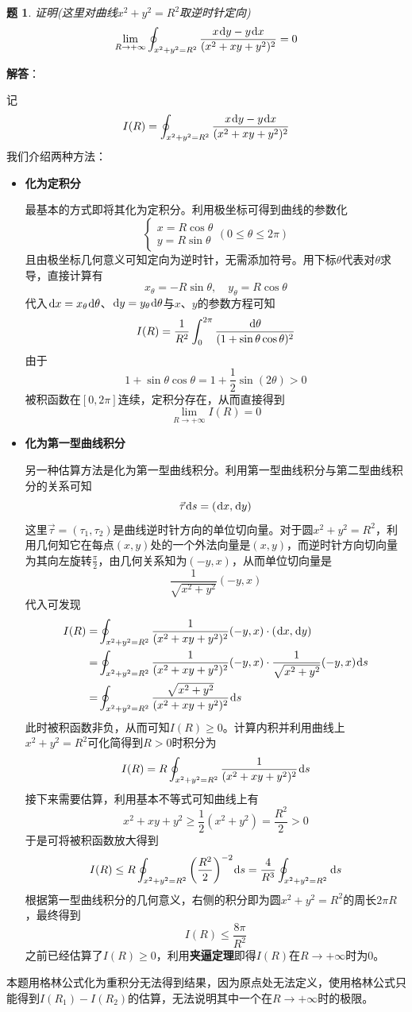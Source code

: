 \documentclass[a4paper,UTF8,fontset=windows,AutoFakeBold]{ctexart}
\newcommand*{\dr}{\hspace{0.07em}\mathrm{d}}
\newcommand*{\note}{\noindent *}
\theoremstyle{ex}
\newtheorem{exercise}{题}
\newcommand{\sol}[1]{{\vspace{5pt}\kaishu\noindent\textbf{解答}：\vspace{-3pt}
\begin{compactitem}
    \item[] #1
\end{compactitem}
}}
\begin{document}
\begin{framed}
\begin{exercise}\label{circle normal}
    证明(这里对曲线$x^2+y^2=R^2$取逆时针定向)
    $$\lim_{R\to+\infty}\oint_{x^2+y^2=R^2}\frac{x\dr y-y\dr x}{(x^2+xy+y^2)^2}=0$$
\end{exercise}
\sol{
    记
    $$I(R)=\oint_{x^2+y^2=R^2}\frac{x\dr y-y\dr x}{(x^2+xy+y^2)^2}$$
    我们介绍两种方法：
    \begin{itemize}
        \item \textbf{化为定积分}
        
        最基本的方式即将其化为定积分。利用极坐标可得到曲线的参数化
        $$\begin{cases}x=R\cos\theta\\y=R\sin\theta\end{cases}(0\le\theta\le2\pi)$$
        且由极坐标几何意义可知定向为逆时针，无需添加符号。用下标$\theta$代表对$\theta$求导，直接计算有
        $$x_\theta=-R\sin\theta,\quad y_\theta=R\cos\theta$$
        代入$\dr x=x_\theta\dr\theta$、$\dr y=y_\theta\dr\theta$与$x$、$y$的参数方程可知
        $$I(R)=\frac{1}{R^2}\int_0^{2\pi}\frac{\dr\theta}{(1+\sin\theta\cos\theta)^2}$$
        由于
        $$1+\sin\theta\cos\theta=1+\frac{1}{2}\sin(2\theta)>0$$
        被积函数在$[0,2\pi]$连续，定积分存在，从而直接得到
        $$\lim_{R\to+\infty}I(R)=0$$

        \item \textbf{化为第一型曲线积分}

        另一种估算方法是化为第一型曲线积分。利用第一型曲线积分与第二型曲线积分的关系可知
        $$\vec\tau\dr s=(\dr x,\dr y)$$
        这里$\vec\tau=(\tau_1,\tau_2)$是曲线逆时针方向的单位切向量。对于圆$x^2+y^2=R^2$，利用几何知它在每点$(x,y)$处的一个外法向量是$(x,y)$，而逆时针方向切向量为其向左旋转$\frac{\pi}{2}$，由几何关系知为$(-y,x)$，从而单位切向量是
        $$\frac{1}{\sqrt{x^2+y^2}}(-y,x)$$
        代入可发现
        $$\begin{aligned}I(R)=&\oint_{x^2+y^2=R^2}\frac{1}{(x^2+xy+y^2)^2}(-y,x)\cdot(\dr x,\dr y)\\=&\oint_{x^2+y^2=R^2}\frac{1}{(x^2+xy+y^2)^2}(-y,x)\cdot\frac{1}{\sqrt{x^2+y^2}}(-y,x)\dr s\\=&\oint_{x^2+y^2=R^2}\frac{\sqrt{x^2+y^2}}{(x^2+xy+y^2)^2}\dr s\end{aligned}$$
        此时被积函数非负，从而可知$I(R)\ge0$。计算内积并利用曲线上$x^2+y^2=R^2$可化简得到$R>0$时积分为
        $$I(R)=R\oint_{x^2+y^2=R^2}\frac{1}{(x^2+xy+y^2)^2}\dr s$$
        接下来需要估算，利用基本不等式可知曲线上有
        $$x^2+xy+y^2\ge\frac{1}{2}(x^2+y^2)=\frac{R^2}{2}>0$$
        于是可将被积函数放大得到
        $$I(R)\le R\oint_{x^2+y^2=R^2}\bigg(\frac{R^2}{2}\bigg)^{-2}\dr s=\frac{4}{R^3}\oint_{x^2+y^2=R^2}\dr s$$
        根据第一型曲线积分的几何意义，右侧的积分即为圆$x^2+y^2=R^2$的周长$2\pi R$，最终得到
        $$I(R)\le\frac{8\pi}{R^2}$$
        之前已经估算了$I(R)\ge0$，利用\textbf{夹逼定理}即得$I(R)$在$R\to+\infty$时为0。
    \end{itemize}

    \note 本题用格林公式化为重积分无法得到结果，因为原点处无法定义，使用格林公式只能得到$I(R_1)-I(R_2)$的估算，无法说明其中一个在$R\to+\infty$时的极限。
}
\end{framed}
\end{document}
